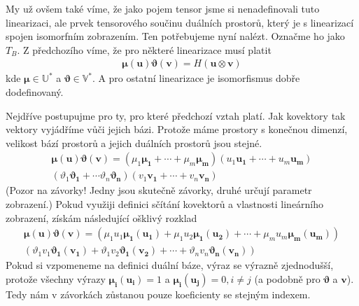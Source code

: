\documentclass[a5paper,12pt]{amsbook}
\theoremstyle{definition}
\newcommand{\myvec}[1]{\bm{#1}}
\newcommand{\myspace}[1]{\mathbb{#1}}
\begin{document}
My už ovšem také víme, že jako pojem tensor jsme si nenadefinovali tuto linearizaci, ale prvek
tensorového součinu duálních prostorů, který je s linearizací spojen isomorfním zobrazením.
Ten potřebujeme nyní nalézt. Označme ho jako $T_B$. Z předchozího víme, že pro některé linearizace
musí platit
\begin{equation*}
\begin{split}
\myvec{\mu}(\myvec{u})\myvec{\vartheta}(\myvec{v}) = H(\myvec{u}\otimes\myvec{v})
\end{split}
\end{equation*}
kde $\myvec{\mu}\in\myspace{U}^*$ a $\myvec{\vartheta}\in\myspace{V}^*$. A pro ostatní
linearizace je isomorfismus dobře dodefinovaný.

Nejdříve postupujme pro ty, pro které předchozí vztah platí. Jak kovektory tak vektory
vyjádříme vůči jejich bázi. Protože máme prostory s konečnou dimenzí, velikost bází prostorů
a jejich duálních prostorů jsou stejné.
\begin{equation*}
\begin{split}
\myvec{\mu}(\myvec{u})\myvec{\vartheta}(\myvec{v}) =
(\mu_1\myvec{\mu_1} + \cdots + \mu_m\myvec{\mu_m})(u_1\myvec{u_1} + \cdots + u_m\myvec{u_m})\\
(\vartheta_1\myvec{\vartheta_1} + \cdots \vartheta_n\myvec{\vartheta_n})(v_1\myvec{v_1} 
  + \cdots + v_n\myvec{v_n})
\end{split}
\end{equation*}
(Pozor na závorky! Jedny jsou skutečně závorky, druhé určují parametr zobrazení.) Pokud využiji
definici sčítání kovektorů a vlastnosti lineárního zobrazení, získám následující ošklivý rozklad
\begin{equation*}
\begin{split}
\myvec{\mu}(\myvec{u})\myvec{\vartheta}(\myvec{v}) =
\left(\mu_1 u_1 \myvec{\mu_1}(\myvec{u_1}) + \mu_1 u_2 \myvec{\mu_1}(\myvec{u_2}) + \cdots 
  + \mu_m u_m \myvec{\mu_m}(\myvec{u_m})\right) \\
\left(\vartheta_1 v_1 \myvec{\vartheta_1}(\myvec{v_1}) + \vartheta_1 v_2 \myvec{\vartheta_1}(\myvec{v_2}) 
  + \cdots + \vartheta_n v_n \myvec{\vartheta_n}(\myvec{v_n})\right)
\end{split}
\end{equation*}
Pokud si vzpomeneme na definici duální báze, výraz se výrazně zjednodušší, protože všechny výrazy
$\myvec{\mu_i}(\myvec{u_i}) = 1$ a $\myvec{\mu_i}(\myvec{u_j}) = 0, i\neq j$ (a podobně pro
$\myvec{\vartheta}$ a $\myvec{v}$). Tedy nám v závorkách zůstanou pouze koeficienty se stejným indexem.
\end{document}
